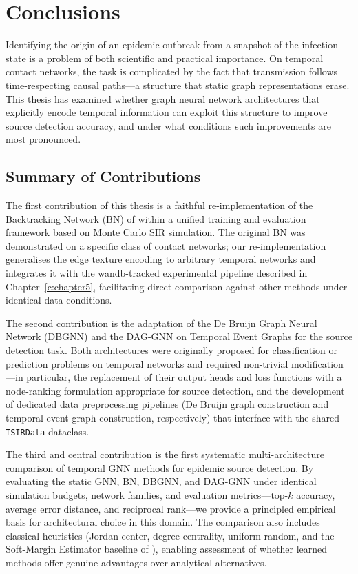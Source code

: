 \chapter{Conclusions}
\label{c:conclusions}

Identifying the origin of an epidemic outbreak from a snapshot of the infection
state is a problem of both scientific and practical importance. On temporal
contact networks, the task is complicated by the fact that transmission
follows time-respecting causal paths---a structure that static graph
representations erase. This thesis has examined whether graph neural network
architectures that explicitly encode temporal information can exploit this
structure to improve source detection accuracy, and under what conditions such
improvements are most pronounced.

\section{Summary of Contributions}
\label{st:summary}

The first contribution of this thesis is a faithful re-implementation of the
Backtracking Network (BN) of \cite{Ru2023} within a unified training and
evaluation framework based on Monte Carlo SIR simulation. The original BN was
demonstrated on a specific class of contact networks; our re-implementation
generalises the edge texture encoding to arbitrary temporal networks and
integrates it with the wandb-tracked experimental pipeline described in
Chapter~\ref{c:chapter5}, facilitating direct comparison against other methods
under identical data conditions.

The second contribution is the adaptation of the De Bruijn Graph Neural Network
(DBGNN) \cite{Qarkaxhija2022} and the DAG-GNN on Temporal Event Graphs for the
source detection task. Both architectures were originally proposed for
classification or prediction problems on temporal networks and required
non-trivial modification---in particular, the replacement of their output heads
and loss functions with a node-ranking formulation appropriate for source
detection, and the development of dedicated data preprocessing pipelines
(De Bruijn graph construction and temporal event graph construction,
respectively) that interface with the shared \texttt{TSIRData} dataclass.

The third and central contribution is the first systematic multi-architecture
comparison of temporal GNN methods for epidemic source detection. By evaluating
the static GNN, BN, DBGNN, and DAG-GNN under identical simulation budgets,
network families, and evaluation metrics---top-$k$ accuracy, average error
distance, and reciprocal rank---we provide a principled empirical basis for
architectural choice in this domain. The comparison also includes classical
heuristics (Jordan center, degree centrality, uniform random, and the
Soft-Margin Estimator baseline of \cite{Sterchi2025}), enabling assessment of
whether learned methods offer genuine advantages over analytical alternatives.

